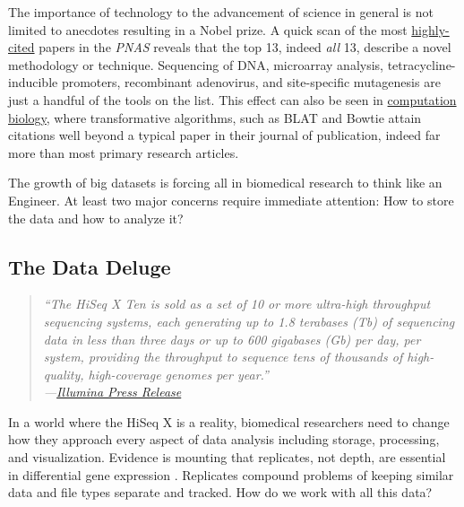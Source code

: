     The importance of technology to the advancement of science in general is not limited to anecdotes resulting in a Nobel prize. A quick scan of the most \href{http://www.pnas.org/reports/most-cited}{highly-cited} papers in the \textit{PNAS} reveals that the top 13, indeed \textit{all} 13, describe a novel methodology or technique. Sequencing of DNA, microarray analysis, tetracycline-inducible promoters, recombinant adenovirus, and site-specific mutagenesis are just a handful of the tools on the list. This effect can also be seen in \href{http://simplystatistics.org/2014/04/07/writing-good-software-can-have-more-impact-than-publishing-in-high-impact-journals-for-genomic-statisticians/}{computation biology}, where transformative algorithms, such as BLAT \citep{Altschul1990} and Bowtie \citep{Langmead2009} attain citations well beyond a typical paper in their journal of publication, indeed far more than most primary research articles.

    The growth of big datasets is forcing all in biomedical research to think like an Engineer. At least two major concerns require immediate attention: How to store the data and how to analyze it?

  \subsection{The Data Deluge}
    \label{Disc:subsec:Dealing with Data Deluge}

    \begin{quote}
      \itshape
      \singlespacing
      ``The HiSeq X Ten is sold as a set of 10 or more ultra-high throughput sequencing systems, each generating up to 1.8 terabases (Tb) of sequencing data in less than three days or up to 600 gigabases (Gb) per day, per system, providing the throughput to sequence tens of thousands of high-quality, high-coverage genomes per year.'' \\
      \indent ---\href{http://bit.ly/PZpegZ}{Illumina Press Release}
      \end{quote}

    In a world where the HiSeq X is a reality, biomedical researchers need to change how they approach every aspect of data analysis including storage, processing, and visualization. Evidence is mounting that replicates, not depth, are essential in differential gene expression \citep{Liu2014}. Replicates compound problems of keeping similar data and file types separate and tracked. How do we work with all this data?

